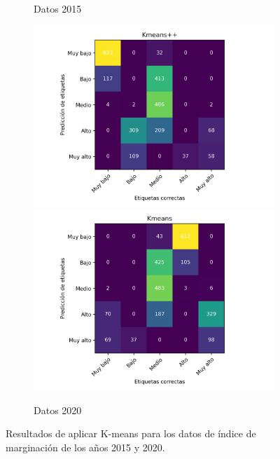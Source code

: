 \begin{figure}[H]
\begin{subfigure}{8.4cm}
        \caption{Datos 2015}
    \end{subfigure}
    \begin{subfigure}{8.4cm}
        \includegraphics[width=1\linewidth]{Graphics/Data_2020/Kmeans++_confusion_matrix.png}
        \includegraphics[width=1\linewidth]{Graphics/Data_2020/Kmeans_random_confusion_matrix.png}
        \caption{Datos 2020}
    \end{subfigure}
    \caption{Resultados de aplicar K-means para los datos de índice de marginación de los años 2015 y 2020.}
    \label{fig:kmeans}
\end{figure}